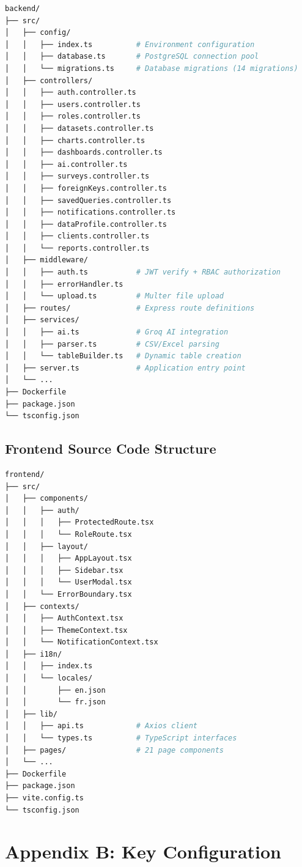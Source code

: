 \documentclass[12pt,a4paper]{report}
\begin{document}
\begin{lstlisting}[style=custom,language=bash]
backend/
├── src/
│   ├── config/
│   │   ├── index.ts          # Environment configuration
│   │   ├── database.ts       # PostgreSQL connection pool
│   │   └── migrations.ts     # Database migrations (14 migrations)
│   ├── controllers/
│   │   ├── auth.controller.ts
│   │   ├── users.controller.ts
│   │   ├── roles.controller.ts
│   │   ├── datasets.controller.ts
│   │   ├── charts.controller.ts
│   │   ├── dashboards.controller.ts
│   │   ├── ai.controller.ts
│   │   ├── surveys.controller.ts
│   │   ├── foreignKeys.controller.ts
│   │   ├── savedQueries.controller.ts
│   │   ├── notifications.controller.ts
│   │   ├── dataProfile.controller.ts
│   │   ├── clients.controller.ts
│   │   └── reports.controller.ts
│   ├── middleware/
│   │   ├── auth.ts           # JWT verify + RBAC authorization
│   │   ├── errorHandler.ts
│   │   └── upload.ts         # Multer file upload
│   ├── routes/               # Express route definitions
│   ├── services/
│   │   ├── ai.ts             # Groq AI integration
│   │   ├── parser.ts         # CSV/Excel parsing
│   │   └── tableBuilder.ts   # Dynamic table creation
│   ├── server.ts             # Application entry point
│   └── ...
├── Dockerfile
├── package.json
└── tsconfig.json
\end{lstlisting}

\section*{Frontend Source Code Structure}

\begin{lstlisting}[style=custom,language=bash]
frontend/
├── src/
│   ├── components/
│   │   ├── auth/
│   │   │   ├── ProtectedRoute.tsx
│   │   │   └── RoleRoute.tsx
│   │   ├── layout/
│   │   │   ├── AppLayout.tsx
│   │   │   ├── Sidebar.tsx
│   │   │   └── UserModal.tsx
│   │   └── ErrorBoundary.tsx
│   ├── contexts/
│   │   ├── AuthContext.tsx
│   │   ├── ThemeContext.tsx
│   │   └── NotificationContext.tsx
│   ├── i18n/
│   │   ├── index.ts
│   │   └── locales/
│   │       ├── en.json
│   │       └── fr.json
│   ├── lib/
│   │   ├── api.ts            # Axios client
│   │   └── types.ts          # TypeScript interfaces
│   ├── pages/                # 21 page components
│   └── ...
├── Dockerfile
├── package.json
├── vite.config.ts
└── tsconfig.json
\end{lstlisting}

\chapter*{Appendix B: Key Configuration}
\end{document}
